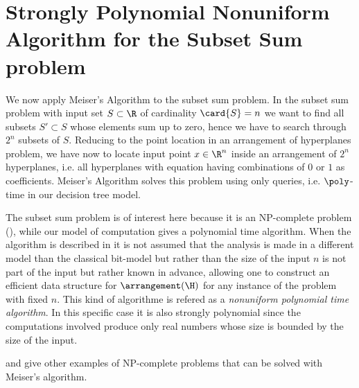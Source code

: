 \section{Strongly Polynomial Nonuniform Algorithm for the Subset Sum problem}

We now apply Meiser's Algorithm to the subset sum problem. In the subset sum
problem with input set $S \subset \R$ of cardinality $\card{S} = n$ we want to
find all subsets $S' \subset S$ whose elements sum up to zero, hence we have
to search through $2^n$ subsets of $S$. Reducing to the point location in an
arrangement of hyperplanes problem, we have now to locate input point $x \in
\R^n$ inside an arrangement of $2^n$ hyperplanes, i.e. all hyperplanes with
equation having combinations of $0$ or $1$ as coefficients. Meiser's Algorithm
solves this problem using only  queries, i.e. $\poly$-time
in our decision tree model.

The subset sum problem is of interest here because it is an NP-complete problem
(\cite{karp:1972}), while our model of computation gives a polynomial time
algorithm. When the algorithm is described in \cite{burgisser:1997} it is not
assumed that the analysis is made in a different model than the classical
bit-model but rather than the size of the input $n$ is not part of the input
but rather known in advance, allowing one to construct an efficient data
structure for $\arrangement(\H)$ for any instance of the problem with fixed $n$. This
kind of algorithme is refered as a \emph{nonuniform polynomial time algorithm}.
In this specific case it is also strongly polynomial since the computations
involved produce only real numbers whose size is bounded by the size of the
input.

\cite{burgisser:1997} and \cite{meiser:1993} give other examples of
NP-complete problems that can be solved with Meiser's algorithm.
